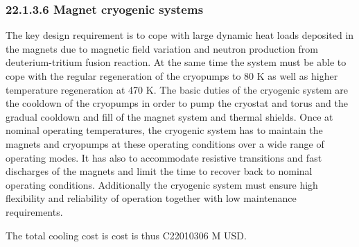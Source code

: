 \subsubsection*{22.1.3.6 Magnet cryogenic systems}

The key design requirement is to cope with large dynamic heat loads deposited in the
magnets due to magnetic field variation and neutron production from deuterium-tritium
fusion reaction. At the same time the system must be able to cope with the regular
regeneration of the cryopumps to 80 K as well as higher temperature regeneration at 470 K.
The basic duties of the cryogenic system are the cooldown of the cryopumps in order
to pump the cryostat and torus and the gradual cooldown and fill of the magnet system and
thermal shields. Once at nominal operating temperatures, the cryogenic system has to
maintain the magnets and cryopumps at these operating conditions over a wide range of
operating modes. It has also to accommodate resistive transitions and fast discharges of the
magnets and limit the time to recover back to nominal operating conditions. Additionally
the cryogenic system must ensure high flexibility and reliability of operation together with
low maintenance requirements.

The total cooling cost is cost is thus C22010306 M USD.



